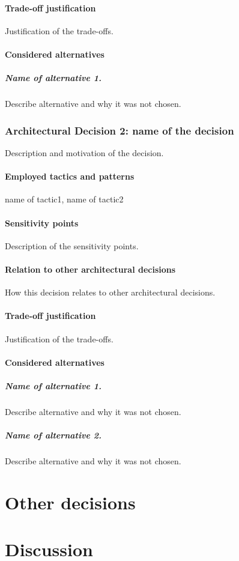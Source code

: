 \subsubsection*{Trade-off justification}
Justification of the trade-offs.

\subsubsection*{Considered alternatives}
\paragraph{Name of alternative 1.}
Describe alternative and why it was not chosen.

\subsection*{Architectural Decision 2:
name of the decision}

Description and motivation of the decision.

\subsubsection*{Employed tactics and patterns}
name of tactic1,
name of tactic2

\subsubsection*{Sensitivity points}
Description of the sensitivity points.

\subsubsection*{Relation to other architectural decisions}
How this decision relates to other architectural decisions.

\subsubsection*{Trade-off justification}
Justification of the trade-offs.

\subsubsection*{Considered alternatives}
\paragraph{Name of alternative 1.}
Describe alternative and why it was not chosen.

\paragraph{Name of alternative 2.}
Describe alternative and why it was not chosen.



\chapter{Other decisions}\label{sec:otherdecisions}



\chapter{Discussion}\label{sec:discussion}
